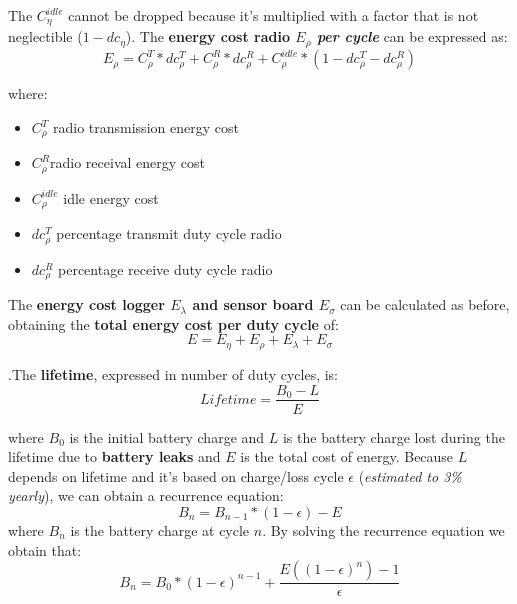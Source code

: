 \documentclass[10pt,a4paper]{report}
\theoremstyle{definition}
\begin{document}
The $C_{\eta}^{idle}$ cannot be dropped because it's multiplied with a factor that is not neglectible ($1-dc_{\eta}$).
The \textbf{energy cost radio $E_{\rho}$ \textit{per cycle}} can be expressed as: 	
\begin{equation}
	E_{\rho} = C_{\rho}^{T}*dc_{\rho}^{T}+ C_{\rho}^{R}*dc_{\rho}^{R} + C_{\rho}^{idle}*(1-dc_{\rho}^{T}-dc_{\rho}^{R})
\end{equation}

where:


\begin{itemize}

	\item 
	$C_{\rho}^{T}$ radio transmission energy cost
	\item 
	$C_{\rho}^{R}$radio receival energy cost
	\item 
	$C_{\rho}^{idle}$ idle energy cost
	\item 
	$dc_{\rho}^{T}$ percentage transmit duty cycle radio
	\item 
	$dc_{\rho}^{R}$ percentage receive duty cycle radio

	
\end{itemize}

	The \textbf{energy cost logger $E_{\lambda}$ and sensor board $E_{\sigma}$} can be calculated as before, obtaining the \textbf{total energy cost per duty cycle} of:
\begin{equation}
	E = E_{\eta} + E_{\rho} + E_{\lambda} + E_{\sigma}
\end{equation}

.The \textbf{lifetime}, expressed in number of duty cycles, is:
\begin{equation}
	Lifetime = \frac{B_{0} - L}{E}
\end{equation}

where $B_{0}$ is the initial battery charge and $L$ is the battery charge lost during the lifetime due to \textbf{battery leaks} and $E$ is the total cost of energy. Because $L$ depends on lifetime and it's based on charge/loss cycle $\epsilon$ (\textit{estimated to 3\% yearly}), we can obtain a recurrence equation:
\begin{equation}
	B_{n} = B_{n-1}*(1-\epsilon) - E
\end{equation}
where $B_{n}$ is the battery charge at cycle $n$. By solving the recurrence equation we obtain that:
\begin{equation}
	B_{n} = B_{0}*(1-\epsilon)^{n-1} + \frac{E((1-\epsilon)^{n})-1}{\epsilon}
\end{equation}
\end{document}
